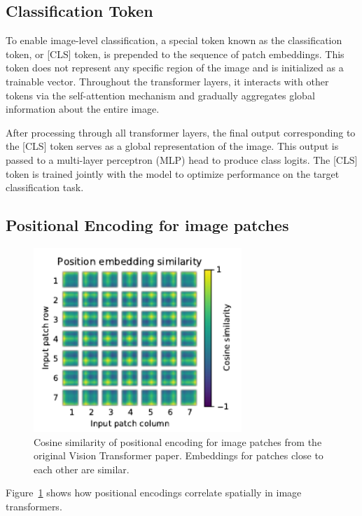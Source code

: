 \documentclass{pracalicmgr}
\begin{document}
\subsection{Classification Token}

To enable image-level classification, a special token known as the classification token, or [CLS] token, is prepended to the sequence of patch embeddings. This token does not represent any specific region of the image and is initialized as a trainable vector. Throughout the transformer layers, it interacts with other tokens via the self-attention mechanism and gradually aggregates global information about the entire image.

After processing through all transformer layers, the final output corresponding to the [CLS] token serves as a global representation of the image. This output is passed to a multi-layer perceptron (MLP) head to produce class logits. The [CLS] token is trained jointly with the model to optimize performance on the target classification task.

\subsection{Positional Encoding for image patches}

\begin{figure}[h]
    \centering
    \includegraphics[width=0.7\textwidth]{src/imNetEncodings.pdf}
    \caption{Cosine similarity of positional encoding for image patches from the original Vision Transformer paper. Embeddings for patches close to each other are similar.}
    \label{fig:imNetEncodings}
\end{figure}

Figure~\ref{fig:imNetEncodings} shows how positional encodings correlate spatially in image transformers.
\end{document}
